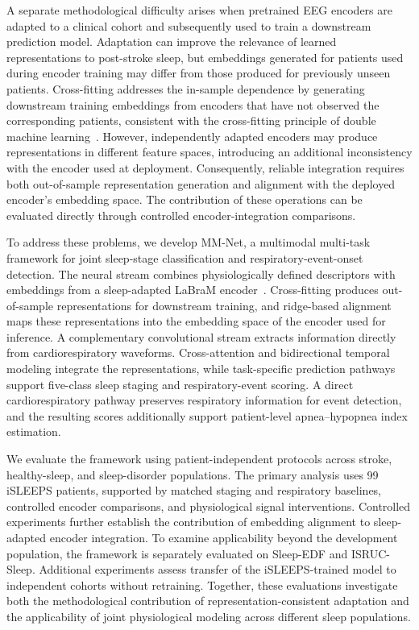 \documentclass[a4paper,fleqn]{cas-sc}
\begin{document}
A separate methodological difficulty arises when pretrained EEG encoders are adapted to a clinical cohort and subsequently used to train a downstream prediction model. Adaptation can improve the relevance of learned representations to post-stroke sleep, but embeddings generated for patients used during encoder training may differ from those produced for previously unseen patients. Cross-fitting addresses the in-sample dependence by generating downstream training embeddings from encoders that have not observed the corresponding patients, consistent with the cross-fitting principle of double machine learning~\cite{chernozhukov2018dml}. However, independently adapted encoders may produce representations in different feature spaces, introducing an additional inconsistency with the encoder used at deployment. Consequently, reliable integration requires both out-of-sample representation generation and alignment with the deployed encoder's embedding space. The contribution of these operations can be evaluated directly through controlled encoder-integration comparisons.

To address these problems, we develop MM-Net, a multimodal multi-task framework for joint sleep-stage classification and respiratory-event-onset detection. The neural stream combines physiologically defined descriptors with embeddings from a sleep-adapted LaBraM encoder~\cite{labram2024}. Cross-fitting produces out-of-sample representations for downstream training, and ridge-based alignment maps these representations into the embedding space of the encoder used for inference. A complementary convolutional stream extracts information directly from cardiorespiratory waveforms. Cross-attention and bidirectional temporal modeling integrate the representations, while task-specific prediction pathways support five-class sleep staging and respiratory-event scoring. A direct cardiorespiratory pathway preserves respiratory information for event detection, and the resulting scores additionally support patient-level apnea--hypopnea index estimation.

We evaluate the framework using patient-independent protocols across stroke, healthy-sleep, and sleep-disorder populations. The primary analysis uses 99 iSLEEPS patients, supported by matched staging and respiratory baselines, controlled encoder comparisons, and physiological signal interventions. Controlled experiments further establish the contribution of embedding alignment to sleep-adapted encoder integration. To examine applicability beyond the development population, the framework is separately evaluated on Sleep-EDF and ISRUC-Sleep. Additional experiments assess transfer of the iSLEEPS-trained model to independent cohorts without retraining. Together, these evaluations investigate both the methodological contribution of representation-consistent adaptation and the applicability of joint physiological modeling across different sleep populations.
\end{document}
